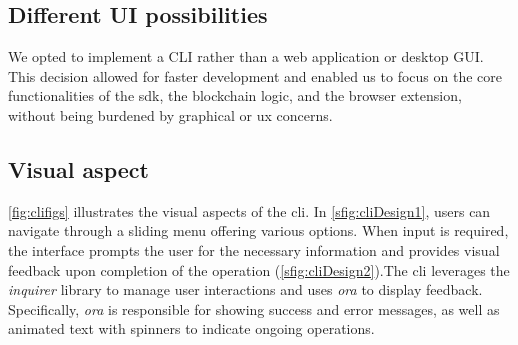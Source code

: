 \subsection{Different UI possibilities}
We opted to implement a CLI rather than a web application or desktop GUI. This decision allowed for faster development and enabled us to focus on the core functionalities of the \acrshort{sdk}, the blockchain logic, and the browser extension, without being burdened by graphical or \acrshort{ux} concerns.

\subsection{Visual aspect}
\cref{fig:clifigs} illustrates the visual aspects of the \acrshort{cli}. In \cref{sfig:cliDesign1}, users can navigate through a sliding menu offering various options. When input is required, the interface prompts the user for the necessary information and provides visual feedback upon completion of the operation (\cref{sfig:cliDesign2}).The \acrshort{cli} leverages the \textit{inquirer} library to manage user interactions and uses \textit{ora} to display feedback. Specifically, \textit{ora} is responsible for showing success and error messages, as well as animated text with spinners to indicate ongoing operations.

